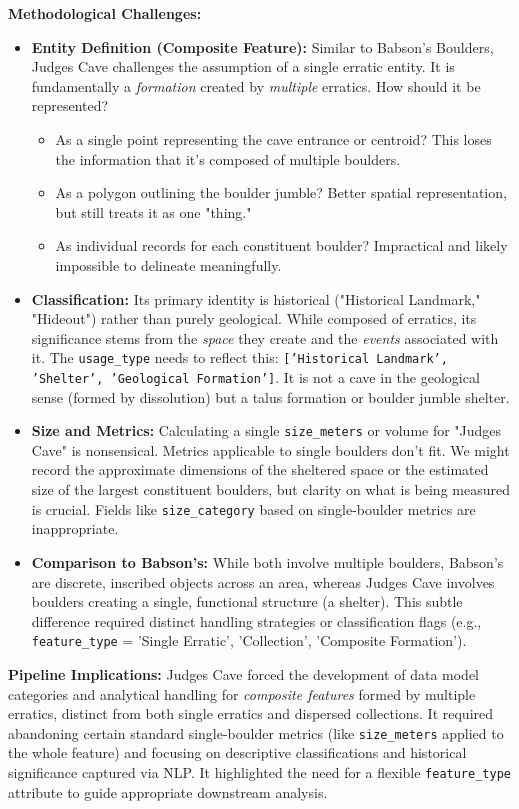 \documentclass[
11pt, %
english, %
singlespacing, %
headsepline, %
]{MastersDoctoralThesis} %
\begin{document}
\textbf{Methodological Challenges:}
\begin{itemize}
    \item \textbf{Entity Definition (Composite Feature):} Similar to Babson's Boulders, Judges Cave challenges the assumption of a single erratic entity. It is fundamentally a \emph{formation} created by \emph{multiple} erratics. How should it be represented?
        \begin{itemize}
            \item As a single point representing the cave entrance or centroid? This loses the information that it's composed of multiple boulders.
            \item As a polygon outlining the boulder jumble? Better spatial representation, but still treats it as one "thing."
            \item As individual records for each constituent boulder? Impractical and likely impossible to delineate meaningfully.
        \end{itemize}
    \item \textbf{Classification:} Its primary identity is historical ("Historical Landmark," "Hideout") rather than purely geological. While composed of erratics, its significance stems from the \emph{space} they create and the \emph{events} associated with it. The \texttt{usage\_type} needs to reflect this: \texttt{['Historical Landmark', 'Shelter', 'Geological Formation']}. It is not a cave in the geological sense (formed by dissolution) but a talus formation or boulder jumble shelter.
    \item \textbf{Size and Metrics:} Calculating a single \texttt{size\_meters} or volume for "Judges Cave" is nonsensical. Metrics applicable to single boulders don't fit. We might record the approximate dimensions of the sheltered space or the estimated size of the largest constituent boulders, but clarity on what is being measured is crucial. Fields like \texttt{size\_category} based on single-boulder metrics are inappropriate.
    \item \textbf{Comparison to Babson's:} While both involve multiple boulders, Babson's are discrete, inscribed objects across an area, whereas Judges Cave involves boulders creating a single, functional structure (a shelter). This subtle difference required distinct handling strategies or classification flags (e.g., \texttt{feature\_type} = 'Single Erratic', 'Collection', 'Composite Formation').
\end{itemize}

\textbf{Pipeline Implications:} Judges Cave forced the development of data model categories and analytical handling for \emph{composite features} formed by multiple erratics, distinct from both single erratics and dispersed collections. It required abandoning certain standard single-boulder metrics (like \texttt{size\_meters} applied to the whole feature) and focusing on descriptive classifications and historical significance captured via NLP. It highlighted the need for a flexible \texttt{feature\_type} attribute to guide appropriate downstream analysis.
\end{document}
